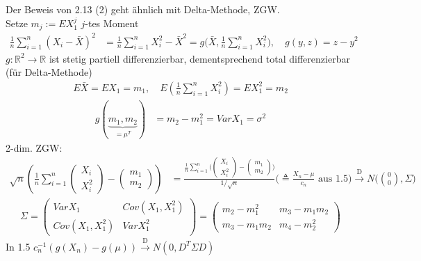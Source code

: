 \documentclass[a4paper,openany]{book}
\theoremstyle{mytheoremstyle}
\theoremstyle{mytheoremstyle2}
\newtheorem*{cbew}{Beweis}
\newenvironment{bew}[1][]{%
  \ifthenelse{\boolean{showbew}}{%
    \begin{cbew}[#1]%
  }{%
    \expandafter\comment%
  }%
}{%
  \ifthenelse{\boolean{showbew}}{%
    \end{cbew}%
  }{%
    \expandafter\endcomment%
  }%
}
\begin{document}
\begin{bew}[2.13 (1)]
  Der Beweis von 2.13 (2) geht ähnlich mit Delta-Methode, ZGW. \\
  Setze $m_j:=EX_1^j$ $j$-tes Moment
  \begin{align*}
    \frac{1}{n}\sum_{i=1}^{n}{(X_i-\bar{X})^2}&=\frac{1}{n}\sum_{i=1}^{n}{X_i^2-\bar{X}^2}=g\bigg(\bar{X},\frac{1}{n}\sum_{i=1}^{n}{X_i^2}\bigg), \quad g(y,z)=z-y^2 
  \end{align*}
  $g:\mathbb{R}^2\to \mathbb{R}$ ist stetig partiell differenzierbar, dementsprechend total differenzierbar (für Delta-Methode)
  \begin{align*}
    E \bar{X}=EX_1=m_1, \quad E \left(\frac{1}{n}\sum_{i=1}^{n}{X_i^2}\right)=EX_1^2=m_2
  \end{align*}
  \begin{align*}
    g(\underbrace{m_1,m_2}_{=\mu ^T})&=m_2-m_1^2=Var X_1=\sigma ^2
  \end{align*}
  2-dim. ZGW:
    \begin{align*}
     \sqrt{n}\left(\frac{1}{n}\sum_{i=1}^{n}{\begin{pmatrix}X_i\\X_i^2\end{pmatrix}-\begin{pmatrix}m_1\\m_2\end{pmatrix}}\right)
     &=\frac{\frac{1}{n}\sum\limits_{i=1 }^{n}{\bigg(\begin{pmatrix}X_i\\X_i^2\end{pmatrix}-\begin{pmatrix}m_1\\m_2\end{pmatrix}\bigg)}}{1/\sqrt{n}}\bigg(\triangleq \frac{X_n-\mu }{c_n}\text{ aus 1.5}\bigg)\overset{\text{D}}\to N\bigg(\binom{0}{0},\Sigma\bigg)
  \end{align*}
    \begin{align*}\Sigma = \begin{pmatrix}
      Var X_1&Cov(X_1,X_1^2)\\Cov(X_1,X_1^2)&Var X_1^2
    \end{pmatrix}=\begin{pmatrix}
      m_2-m_1^2&m_3-m_1m_2\\m_3-m_1m_2&m_4-m_2^2
    \end{pmatrix}
  \end{align*}
  In 1.5 $c_n ^{-1}(g(X_n)-g(\mu ))\overset{\text{D}}\to N(0,D^T\Sigma D)$ \\

\end{bew}
\end{document}
